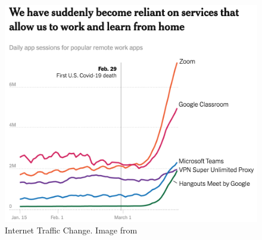 \begin{figure} [!h]
\centering
\includegraphics[scale=.3]{methodology/images/nyt_covid_internet.png}
\caption[Internet Traffic Change due to COVID]{Internet Traffic Change.  Image from \cite{nyt_corna_virus}}
\label{img_nyt_covid}
\end{figure}